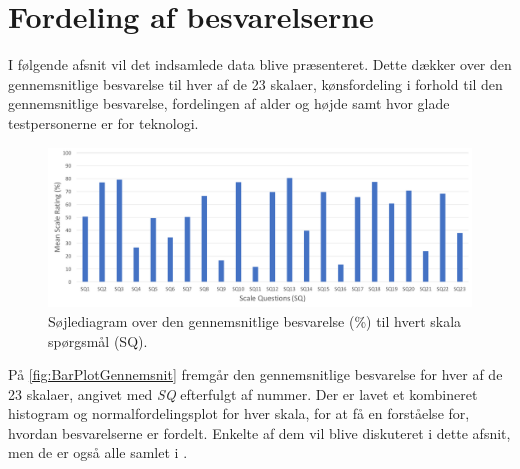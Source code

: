 \section{Fordeling af besvarelserne}
\label{TestAfSkalaFordeling}
%
%
I følgende afsnit vil det indsamlede data blive præsenteret. Dette dækker over den gennemsnitlige besvarelse til hver af de 23 skalaer, kønsfordeling i forhold til den gennemsnitlige besvarelse, fordelingen af alder og højde samt hvor glade testpersonerne er for teknologi. 
%
\begin{figure}[H]
\centering
\includegraphics[width = \textwidth]{Figure/DatabehandlingSkalaer/DataPresentation/MeanBarplot} 
\caption{Søjlediagram over den gennemsnitlige besvarelse (\%) til hvert skala spørgsmål (SQ).}
\label{fig:BarPlotGennemsnit}
\end{figure}
\noindent
%
På \autoref{fig:BarPlotGennemsnit} fremgår den gennemsnitlige besvarelse for hver af de 23 skalaer, angivet med \textit{SQ} efterfulgt af nummer.\blankline
%
Der er lavet et kombineret histogram og normalfordelingsplot for hver skala, for at få en forståelse for, hvordan besvarelserne er fordelt. Enkelte af dem vil blive diskuteret i dette afsnit, men de er også alle samlet i .


